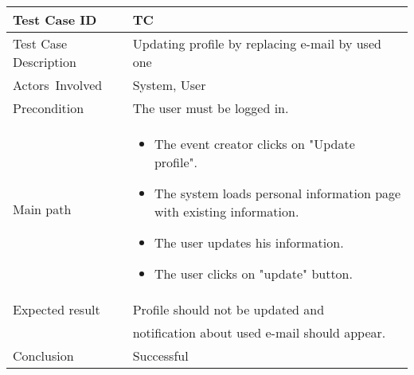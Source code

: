 \begin{center} \begin{tabular}{|l|l|}
  \hline
  Test Case ID & TC \z\\
  \hline
  Test Case Description & Updating profile by replacing e-mail by used one\\
  \hline
  Actors Involved & System, User\\
   \hline
  Precondition & The user must be logged in.\\
  \hline
  Main path &   \begin{minipage}{5in}
    \vskip 4pt
            \begin{itemize}
              \item The event creator clicks on "Update profile".
              \item The system loads personal information page with existing information.
              \item The user updates his information.
              \item The user clicks on "update" button.
            \end{itemize}
    \vskip 4pt
  \end{minipage}  \\
  \hline
  Expected result & Profile should not be updated and \\
  &notification about used e-mail should appear.\\
  \hline
  Conclusion & Successful\\
  \hline
\end{tabular} \end{center}


